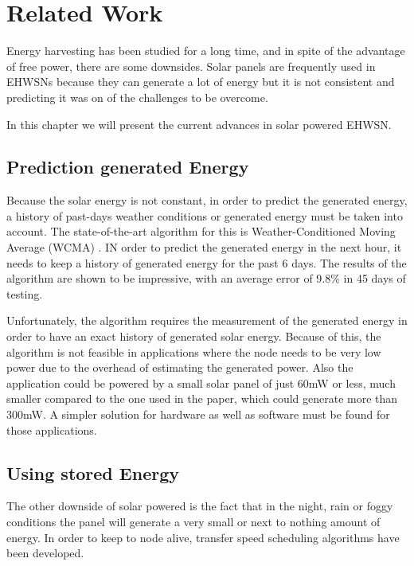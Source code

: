 \normalfont\normalsize
\chapter{Related Work}
\label{chap:related}

Energy harvesting has been studied for a long time, and in spite of the advantage of free power,
there are some downsides. Solar panels are frequently used in EHWSNs because they can generate a
lot of energy but it is not consistent and predicting it was on of the challenges to be
overcome.

In this chapter we will present the current advances in solar powered EHWSN.

\section {Prediction generated Energy}

Because the solar energy is not constant, in order to predict the generated energy, a history of
past-days weather conditions or generated energy must be taken into account. The state-of-the-art
algorithm for this is Weather-Conditioned Moving Average (WCMA) \cite{piorno2009prediction}. IN
order to predict the generated energy in the next hour, it needs to keep a history of generated
energy for the past 6 days. The results of the algorithm are shown to be impressive, with an average error of
9.8\% in 45 days of testing.

Unfortunately, the algorithm requires the measurement of the generated energy in order to have an
exact history of generated solar energy. Because of this, the algorithm is not feasible in
applications where the node needs to be very low power due to the overhead of estimating the
generated power. Also the application could be powered by a small solar panel of just
60mW or less, much smaller compared to the one used in the paper, which could generate more than 300mW.
A simpler solution for hardware as well as software must be found for those applications.


\section {Using stored Energy}
The other downside of solar powered is the fact that in the night, rain or foggy conditions the
panel will generate a very small or next to nothing amount of energy. In order to keep to node
alive, transfer speed scheduling algorithms have been developed.

